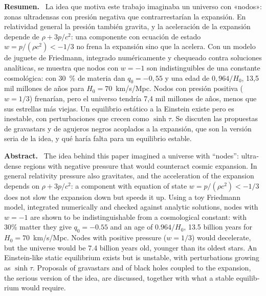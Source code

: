 \documentclass[11pt,a4paper]{article}
\title{\titulo}
\author{Bruno Loiacono\\[2pt]\small Estudiante de Física, Universidad de Buenos Aires}
\date{Noviembre de 2026\\[8pt]\fbox{\small Preprint, documento de trabajo sin revisión por pares}}
\newenvironment{resumen}{\par\noindent\small\textbf{Resumen.}\ }{\par\medskip}
\newenvironment{abstractEN}{\par\noindent\small\begin{otherlanguage}{english}\textbf{Abstract.}\ }{\end{otherlanguage}\par\medskip}
\begin{document}
\maketitle
\thispagestyle{fancy}

\begin{resumen}
La idea que motiva este trabajo imaginaba un universo con «nodos»: zonas ultradensas con presión negativa que contrarrestarían la expansión. En relatividad general la presión también gravita, y la aceleración de la expansión depende de $\rho + 3p/c^2$: una componente con ecuación de estado $w = p/(\rho c^2) < -1/3$ no frena la expansión sino que la acelera. Con un modelo de juguete de Friedmann, integrado numéricamente y chequeado contra soluciones analíticas, se muestra que nodos con $w = -1$ son indistinguibles de una constante cosmológica: con 30~\% de materia dan $q_0 = -0{,}55$ y una edad de $0{,}964/H_0$, 13,5 mil millones de años para $H_0 = 70$~km/s/Mpc. Nodos con presión positiva ($w = 1/3$) frenarían, pero el universo tendría 7,4 mil millones de años, menos que sus estrellas más viejas. Un equilibrio estático a la Einstein existe pero es inestable, con perturbaciones que crecen como $\sinh\tau$. Se discuten las propuestas de gravastars y de agujeros negros acoplados a la expansión, que son la versión seria de la idea, y qué haría falta para un equilibrio estable.
\end{resumen}

\begin{abstractEN}
The idea behind this paper imagined a universe with “nodes”: ultradense regions with negative pressure that would counteract cosmic expansion. In general relativity pressure also gravitates, and the acceleration of the expansion depends on $\rho + 3p/c^2$: a component with equation of state $w = p/(\rho c^2) < -1/3$ does not slow the expansion down but speeds it up. Using a toy Friedmann model, integrated numerically and checked against analytic solutions, nodes with $w = -1$ are shown to be indistinguishable from a cosmological constant: with 30\% matter they give $q_0 = -0.55$ and an age of $0.964/H_0$, 13.5 billion years for $H_0 = 70$~km/s/Mpc. Nodes with positive pressure ($w = 1/3$) would decelerate, but the universe would be 7.4 billion years old, younger than its oldest stars. An Einstein-like static equilibrium exists but is unstable, with perturbations growing as $\sinh\tau$. Proposals of gravastars and of black holes coupled to the expansion, the serious version of the idea, are discussed, together with what a stable equilibrium would require.
\end{abstractEN}
\end{document}
